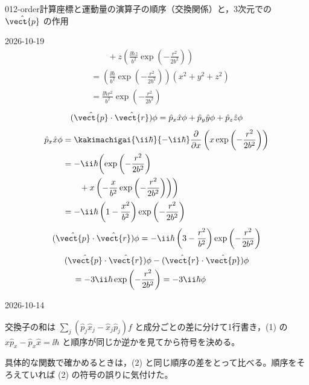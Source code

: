 \documentclass[uplatex,dvipdfmx,a4paper,11pt]{jsarticle}
\begin{document}
\begin{mondai}{012-order}{計算}{座標と運動量の演算子の順序（交換関係）と，3次元での $\hat{\vect{p}}$ の作用}
\begin{kotaeutsushi}{2026-10-19}
\begin{align*}
&\qquad+z\left(\frac{\ii\hbar z}{b^{2}}\exp\left(-\frac{r^{2}}{2b^{2}}\right)\right)\\
&=\left(\frac{\ii\hbar}{b^{2}}\exp\left(-\frac{r^{2}}{2b^{2}}\right)\right)(x^{2}+y^{2}+z^{2})\\
&=\frac{\ii\hbar r^{2}}{b^{2}}\exp\left(-\frac{r^{2}}{2b^{2}}\right)
\end{align*}
\[ (\hat{\vect{p}}\cdot\hat{\vect{r}})\phi=\hat{p}_{x}\hat{x}\phi+\hat{p}_{y}\hat{y}\phi+\hat{p}_{z}\hat{z}\phi \]
\begin{align*}
\hat{p}_{x}\hat{x}\phi&=\kakimachigai{\ii\hbar}{-\ii\hbar}\frac{\partial}{\partial x}\left(x\exp\left(-\frac{r^{2}}{2b^{2}}\right)\right)\\
&=-\ii\hbar\biggl(\exp\left(-\frac{r^{2}}{2b^{2}}\right)\\
&\qquad+x\left(-\frac{x}{b^{2}}\exp\left(-\frac{r^{2}}{2b^{2}}\right)\right)\biggr)\\
&=-\ii\hbar\left(1-\frac{x^{2}}{b^{2}}\right)\exp\left(-\frac{r^{2}}{2b^{2}}\right)
\end{align*}
\[ (\hat{\vect{p}}\cdot\hat{\vect{r}})\phi=-\ii\hbar\left(3-\frac{r^{2}}{b^{2}}\right)\exp\left(-\frac{r^{2}}{2b^{2}}\right) \]
\begin{align*}
&(\hat{\vect{p}}\cdot\hat{\vect{r}})\phi-(\hat{\vect{r}}\cdot\hat{\vect{p}})\phi\\
&\quad=-3\ii\hbar\exp\left(-\frac{r^{2}}{2b^{2}}\right)=-3\ii\hbar\phi
\end{align*}
\end{kotaeutsushi}
\begin{maekizuki}{2026-10-14}
\item 交換子の和は $\sum_{j}(\hat{p}_{j}\hat{x}_{j}-\hat{x}_{j}\hat{p}_{j})f$ と成分ごとの差に分けて1行書き，(1) の $\hat{x}\hat{p}_{x}-\hat{p}_{x}\hat{x}=\ii\hbar$ と順序が同じか逆かを見てから符号を決める。
\item 具体的な関数で確かめるときは，(2) と同じ順序の差をとって比べる。順序をそろえていれば (2) の符号の誤りに気付けた。
\end{maekizuki}
\end{mondai}
\end{document}
